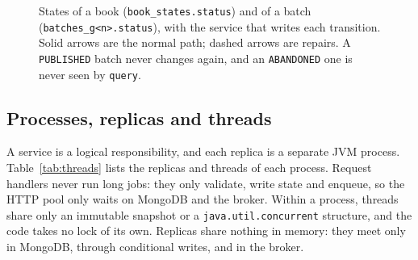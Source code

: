 \documentclass[11pt,a4paper]{article}
\newcommand{\code}[1]{\nolinkurl{#1}}
\begin{document}
\begin{figure}[ht]
\caption{States of a book (\code{book_states.status}) and of a batch (\code{batches_g<n>.status}), with the service
that writes each transition. Solid arrows are the normal path; dashed arrows are repairs. A \code{PUBLISHED} batch never
changes again, and an \code{ABANDONED} one is never seen by \code{query}.}
\label{fig:lifecycle}
\end{figure}

\subsection{Processes, replicas and threads}
\label{sec:threads}

A service is a logical responsibility, and each replica is a separate JVM process. Table~\ref{tab:threads} lists the
replicas and threads of each process. Request handlers never run long jobs: they only validate, write state and
enqueue, so the HTTP pool only waits on MongoDB and the broker. Within a process, threads share only an immutable
snapshot or a \code{java.util.concurrent} structure, and the code takes no lock of its own. Replicas share nothing in
memory: they meet only in MongoDB, through conditional writes, and in the broker.
\end{document}
